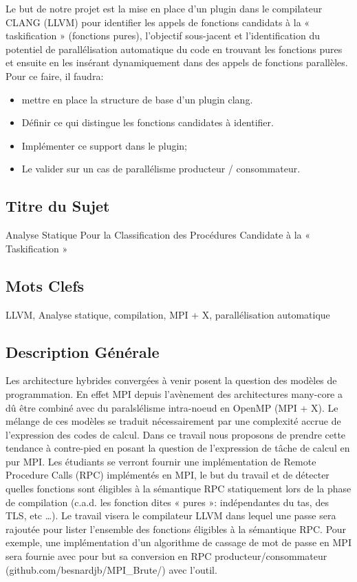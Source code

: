 \documentclass[12pt,titlepage]{article}
\begin{document}
Le but de notre projet est la mise en place d’un plugin dans le compilateur CLANG (LLVM) pour identifier les appels de fonctions candidats à la « taskification » (fonctions pures), l'objectif sous-jacent et l'identification du potentiel de parallélisation automatique du code en trouvant les fonctions pures et ensuite en les insérant dynamiquement dans des appels de fonctions parallèles.\\
Pour ce faire, il faudra: \\

\begin{itemize}
	\item mettre en place la structure de base d’un plugin clang.
	\item Définir ce qui distingue les fonctions candidates à identifier.
	\item Implémenter ce support dans le plugin;
	\item Le valider sur un cas de parallélisme producteur /
	consommateur.
\end{itemize}

\subsection{Titre du Sujet}

Analyse Statique Pour la Classification des Procédures Candidate à la « Taskification »


\subsection{Mots Clefs}

LLVM, Analyse statique, compilation, MPI + X, parallélisation automatique


\subsection{Description Générale}

Les architecture hybrides convergées à venir posent la question des modèles de programmation. En effet MPI depuis l’avènement des architectures many-core a dû être combiné avec du paralslélisme intra-noeud en OpenMP (MPI + X). Le mélange de ces modèles se traduit nécessairement par une complexité accrue de l’expression des codes de calcul. Dans ce travail nous proposons de prendre cette tendance à contre-pied en posant la question de l’expression de tâche de calcul en pur MPI. Les étudiants se verront fournir une implémentation de Remote Procedure Calls (RPC) implémentés en MPI, le but du travail et de détecter quelles fonctions sont éligibles à la sémantique RPC statiquement lors de la phase de compilation (c.a.d. les fonction dites « pures »: indépendantes du tas, des TLS, etc …). Le travail visera le compilateur LLVM dans lequel une passe sera rajoutée pour lister l’ensemble des fonctions éligibles à la sémantique RPC. Pour exemple, une implémentation d’un algorithme de cassage de mot de passe en MPI sera fournie avec pour but sa conversion en RPC producteur/consommateur (github.com/besnardjb/MPI\_Brute/) avec l’outil.
\end{document}
